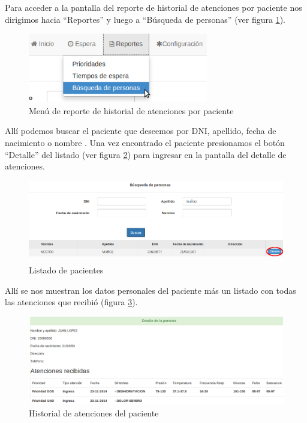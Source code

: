 Para acceder a la pantalla del reporte de historial de atenciones por paciente nos dirigimos hacia ``Reportes'' y luego a ``Búsqueda de personas'' (ver figura \ref{fig:menu_reporte_pacientes}).
\begin{figure}
\centerline{\includegraphics[width=0.7\textwidth]{menu_reporte_pacientes.png}}
\caption{Menú de reporte de historial de atenciones por paciente}
\label{fig:menu_reporte_pacientes}
\end{figure}
Allí podemos buscar el paciente que deseemos por DNI, apellido, fecha de nacimiento o nombre . Una vez encontrado el paciente presionamos el botón ``Detalle'' del listado (ver figura \ref{fig:listado_pacientes}) para ingresar en la pantalla del detalle de atenciones.
\begin{figure}
\centerline{\includegraphics[width=1\textwidth]{listado_pacientes.png}}
\caption{Listado de pacientes}
\label{fig:listado_pacientes}
\end{figure}
Allí se nos muestran los datos personales del paciente más un listado con todas las atenciones que recibió (figura \ref{fig:historial_paciente}).
\begin{figure}
\centerline{\includegraphics[width=1\textwidth]{historial_paciente.png}}
\caption{Historial de atenciones del paciente}
\label{fig:historial_paciente}
\end{figure}